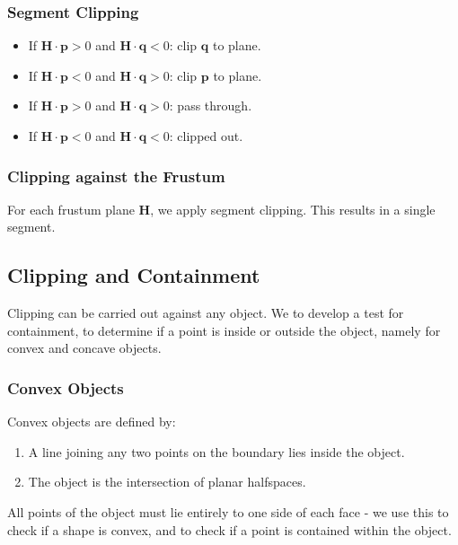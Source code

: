 \documentclass[11pt]{article}
\begin{document}
\subsubsection{Segment Clipping}
\begin{itemize}
  \item If $\textbf{H} \cdot \textbf{p} > 0$ and $\textbf{H} \cdot \textbf{q} < 0$: clip $\textbf{q}$ to plane.
  \item If $\textbf{H} \cdot \textbf{p} < 0$ and $\textbf{H} \cdot \textbf{q} > 0$: clip $\textbf{p}$ to plane.
  \item If $\textbf{H} \cdot \textbf{p} > 0$ and $\textbf{H} \cdot \textbf{q} > 0$: pass through.
  \item If $\textbf{H} \cdot \textbf{p} < 0$ and $\textbf{H} \cdot \textbf{q} < 0$: clipped out.
\end{itemize}

\subsubsection{Clipping against the Frustum}
For each frustum plane $\textbf{H}$, we apply segment clipping.
This results in a single segment.

\subsection{Clipping and Containment}
Clipping can be carried out against any object.
We to develop a test for containment, to determine if a point is inside or outside the object, namely for convex and concave objects.

\subsubsection{Convex Objects}
Convex objects are defined by:
\begin{enumerate}
  \item A line joining any two points on the boundary lies inside the object.
  \item The object is the intersection of planar halfspaces.
\end{enumerate}
All points of the object must lie entirely to one side of each face - we use this to check if a shape is convex, and to check if a point is contained within the object.
\end{document}
